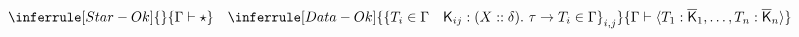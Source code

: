 \begin{gather*}
  \inferrule[Star-Ok] { }
  { \Gamma \vdash \star }
  \quad
  \inferrule[Data-Ok]
  { \left \{ T_i \in \Gamma \quad \fnlab{K}_{ij} : (X :: \delta).~\tau \to T_i \in \Gamma \right \}_{i,j} }
  { \Gamma \vdash \dtlit{T_1:\overline{\fnlab{K}}_1, \ldots , T_n:\overline{\fnlab{K}}_n} }    
\end{gather*}
